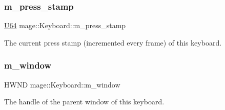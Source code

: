 \subsubsection{\texorpdfstring{m\+\_\+press\+\_\+stamp}{m\_press\_stamp}}
{\footnotesize\ttfamily \hyperlink{namespacemage_a6672cf3c861707ce4a3235a3eb43941d}{U64} mage\+::\+Keyboard\+::m\+\_\+press\+\_\+stamp\hspace{0.3cm}{\ttfamily [private]}}

The current press stamp (incremented every frame) of this keyboard. \hypertarget{classmage_1_1_keyboard_a6be21d99a0678df71f963506dcccc340}{}\label{classmage_1_1_keyboard_a6be21d99a0678df71f963506dcccc340} 
\subsubsection{\texorpdfstring{m\+\_\+window}{m\_window}}
{\footnotesize\ttfamily H\+W\+ND mage\+::\+Keyboard\+::m\+\_\+window\hspace{0.3cm}{\ttfamily [private]}}

The handle of the parent window of this keyboard. 